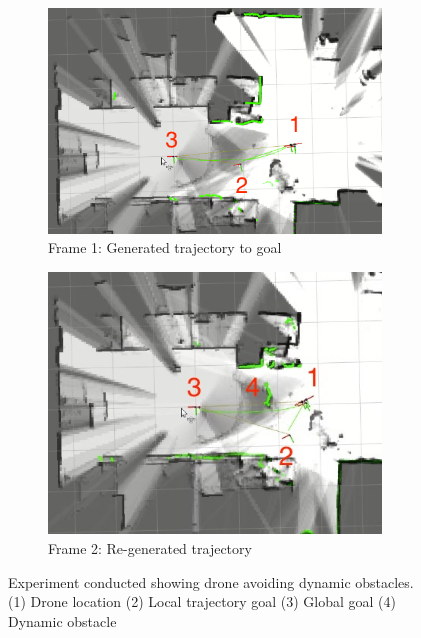 \documentclass[capstone_report.tex]{subfiles}
\begin{document}
\begin{figure}[H]
    \centering
    \begin{subfigure}[b]{0.5\textwidth}
        \centering
        \includegraphics[width=0.97\textwidth]{./imgs/dynamic_objects/an_frame_1.png}
        \caption{Frame 1: Generated trajectory to goal}
        \label{fig:avoid_obs_1}
    \end{subfigure}%
    \begin{subfigure}[b]{0.5\textwidth}
        \centering
        \includegraphics[width=0.97\textwidth]{./imgs/dynamic_objects/an_frame_2.png}
        \caption{Frame 2: Re-generated trajectory}
        \label{fig:avoid_obs_2}
    \end{subfigure}
    \caption{Experiment conducted showing drone avoiding dynamic obstacles.  (1) Drone location (2) Local trajectory goal (3) Global goal (4) Dynamic obstacle\label{fig:avoid_obs}}
\end{figure}
\end{document}
